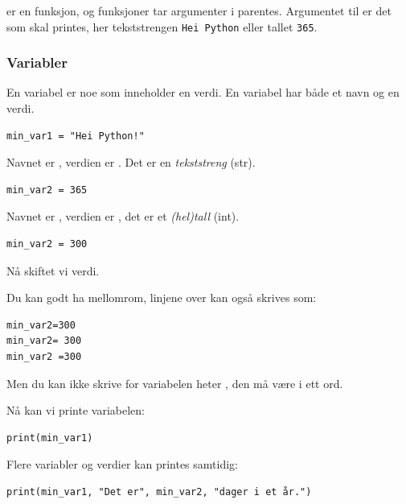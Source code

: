  er en funksjon, og funksjoner tar argumenter i parentes. Argumentet til  er det som skal printes, her tekststrengen \verb|Hei Python| eller tallet \verb|365|.

\subsubsection{Variabler}
En variabel er noe som inneholder en verdi. En variabel har både et navn og en verdi.

\begin{lstlisting}
min_var1 = "Hei Python!"
\end{lstlisting}

Navnet er , verdien er . Det er en \emph{tekststreng} (str). 

\begin{lstlisting}
min_var2 = 365
\end{lstlisting}

Navnet er , verdien er , det er et \emph{(hel)tall} (int).

\begin{lstlisting}
min_var2 = 300
\end{lstlisting}

Nå skiftet vi verdi. 

Du kan godt ha mellomrom, linjene over kan også skrives som: 
\begin{lstlisting}
min_var2=300
min_var2= 300
min_var2 =300
\end{lstlisting}

Men du kan ikke skrive  for variabelen heter , den må være i ett ord. 

Nå kan vi printe variabelen:
\begin{lstlisting}
print(min_var1)
\end{lstlisting}
Flere variabler og verdier kan printes samtidig:
\begin{lstlisting}
print(min_var1, "Det er", min_var2, "dager i et år.")
\end{lstlisting}

